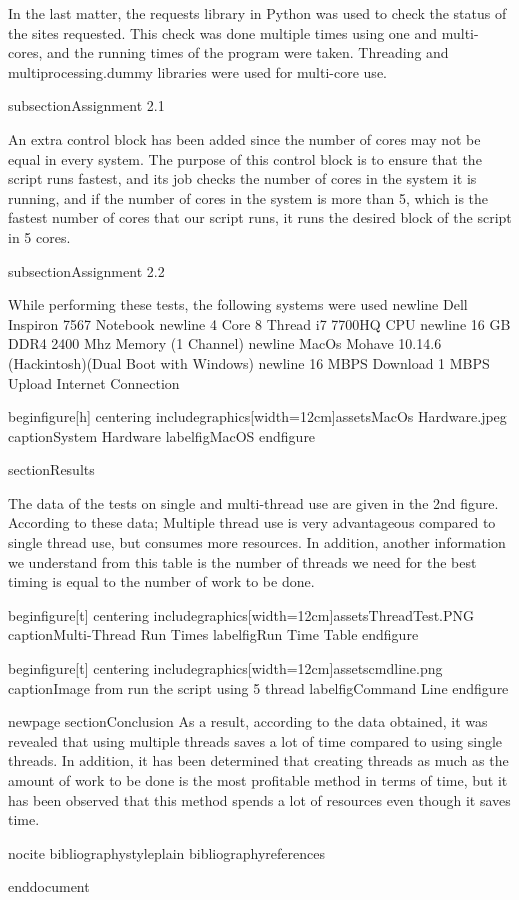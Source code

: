 In the last matter, the requests library in Python was used to check the status of the sites requested. This check was done multiple times using one and multi-cores, and the running times of the program were taken. Threading and multiprocessing.dummy libraries were used for multi-core use.


subsection{Assignment 2.1}

An extra control block has been added since the number of cores may not be equal in every system. The purpose of this control block is to ensure that the script runs fastest, and its job checks the number of cores in the system it is running, and if the number of cores in the system is more than 5, which is the fastest number of cores that our script runs, it runs the desired block of the script in 5 cores.

subsection{Assignment 2.2}

While performing these tests, the following systems were used
newline
Dell Inspiron 7567 Notebook
newline
4 Core  8 Thread i7 7700HQ CPU
newline
16 GB DDR4 2400 Mhz Memory (1 Channel)
newline
MacOs Mohave 10.14.6 (Hackintosh)(Dual Boot with Windows)
newline
16 MBPS Download 1 MBPS Upload Internet Connection

begin{figure}[h]
    centering
    includegraphics[width=12cm]{assetsMacOs Hardware.jpeg}
    caption{System Hardware}
    label{figMacOS}
end{figure}

section{Results}

The data of the tests on single and multi-thread use are given in the 2nd figure. According to these data; Multiple thread use is very advantageous compared to single thread use, but consumes more resources.
In addition, another information we understand from this table is the number of threads we need for the best timing is equal to the number of work to be done.

begin{figure}[t]
    centering
    includegraphics[width=12cm]{assetsThreadTest.PNG}
    caption{Multi-Thread Run Times}
    label{figRun Time Table}
end{figure}

begin{figure}[t]
    centering
    includegraphics[width=12cm]{assetscmdline.png}
    caption{Image from run the script using 5 thread}
    label{figCommand Line}
end{figure}


newpage
section{Conclusion}
As a result, according to the data obtained, it was revealed that using multiple threads saves a lot of time compared to using single threads. In addition, it has been determined that creating threads as much as the amount of work to be done is the most profitable method in terms of time, but it has been observed that this method spends a lot of resources even though it saves time.


nocite{}
bibliographystyle{plain}
bibliography{references}

end{document}


